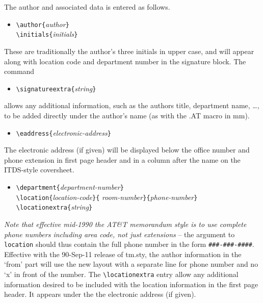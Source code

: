 The author and associated data is entered as follows.
\begin{itemize}
\item[]
\verb|\author{|{\it author\/}\verb|}|\\
\verb|\initials{|{\it initials\/}\verb|}|
\end{itemize}
These are traditionally the author's three initials in upper case,
and will appear along with location code and department number in
the signature block.  The command
\begin{itemize}
\item[]
\verb|\signatureextra{|{\it string}\verb|}|
\end{itemize}
allows any additional information, such as the authors
title, department name, \dots , to be added directly under the
author's name (as with the .AT macro
in mm).
\begin{itemize}
\item[]
\verb|\eaddress{|{\it electronic-address\/}\verb|}|
\end{itemize}
The electronic address (if given) will be displayed below the office
number and phone extension in first page header and in a column
after the name on the ITDS-style coversheet.
\begin{itemize}
\item[]
\verb|\department{|{\it department-number\/}\verb|}|\\
\verb|\location{|{\it location-code\/}\verb|}{|{\it
room-number\/}\verb|}{|{\it phone-number\/}\verb|}|\\
\verb|\locationextra{|{\it string}\verb|}|
\end{itemize}
{\it Note that effective mid-1990 the AT\&T memorandum style is to use
complete phone numbers including area code, not just extensions} -- the
argument to \verb|location| should thus contain the full phone number
in the form \verb|###-###-####|.  Effective with the 90-Sep-11 release
of tm.sty, the author information in the `from' part will use the new
layout with a separate line for phone number and no `x' in front of
the number.
The \verb|\locationextra| entry allow any additional information desired
to be included with the location information in the first page
header.  It appears under the the electronic address (if given).


